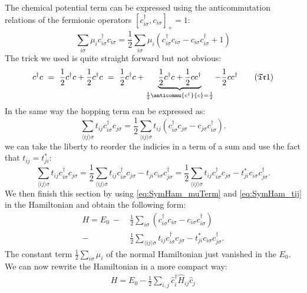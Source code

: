 \documentclass[../main.tex]{subfile}
\begin{document}
The chemical potential term can be expressed using the anticommutation relations of the fermionic operators $[c_{i\sigma}^{\dagger},c_{i\sigma}]_+ = 1$:
\begin{equation}\label{eq:SymHam_muTerm}
    \sum_{i\sigma} \mu_i c_{i\sigma}^{\dagger} c_{i\sigma} = \frac{1}{2}\sum_{i\sigma} \mu_i \left(c_{i\sigma}^{\dagger}c_{i\sigma} - c_{i\sigma}c_{i\sigma}^{\dagger} + 1\right)
\end{equation}
The trick we used is quite straight forward but not obvious: 
\[
    c^{\dagger}c ~=~ \frac{1}{2}c^{\dagger}c + \frac{1}{2}c^{\dagger}c ~=~ \frac{1}{2}c^{\dagger}c + \underbrace{\frac{1}{2}c^{\dagger}c + \frac{1}{2}cc^{\dagger}}_{\frac{1}{2}\anticommu{c^{\dagger}}{c} = \frac{1}{2}} - \frac{1}{2}cc^{\dagger} \tag{$\mathfrak{Tr}$1} \label{eq:Trick1}
\]
In the same way the hopping term can be expressed as:
\[
    \sum_{\langle ij\rangle\sigma} t_{ij} c_{i\sigma}^{\dagger} c_{j\sigma} = \frac{1}{2}\sum_{\langle ij\rangle \sigma} t_{ij} \left(c_{i\sigma}^{\dagger}c_{j\sigma} - c_{j\sigma}c_{i\sigma}^{\dagger}\right).
\]
we can take the liberty to reorder the indicies in a term of a sum and use the fact that $t_{ij} = t_{ji}^{\ast}$:
\begin{equation}\label{eq:SymHam_tij}
    \sum_{\langle ij\rangle\sigma} t_{ij} c_{i\sigma}^{\dagger} c_{j\sigma} = \frac{1}{2}\sum_{\langle ij\rangle \sigma} t_{ij}c_{i\sigma}^{\dagger}c_{j\sigma} - t_{ji}c_{i\sigma}c_{j\sigma}^{\dagger} = \frac{1}{2}\sum_{\langle ij\rangle \sigma} t_{ij}c_{i\sigma}^{\dagger}c_{j\sigma} - t_{ji}^{\ast}c_{i\sigma}c_{j\sigma}^{\dagger}.
\end{equation}
We then finish this section by using \ref{eq:SymHam_muTerm} and \ref{eq:SymHam_tij} in the Hamiltonian and obtain the following form:
\begin{align*}
    H = E_0 ~-~& \frac{1}{2} \sum_{i\sigma} \left(c_{i\sigma}^{\dagger}c_{i\sigma} - c_{i\sigma}c_{i\sigma}^{\dagger}\right)\\
    -& \frac{1}{2}\sum_{\langle ij\rangle \sigma} t_{ij}c_{i\sigma}^{\dagger}c_{j\sigma} - t_{ji}^{\ast}c_{i\sigma}c_{j\sigma}^{\dagger}.
\end{align*}
The constant term $\frac{1}{2} \sum_{i\sigma} \mu_i$ of the normal Hamiltonian just vanished in the $E_0$. 
We can now rewrite the Hamiltonian in a more compact way:
\begin{align}
    H = E_0 - \frac{1}{2}\sum_{i,j} \hat{c}_i^{\dagger} \hat{H}_{ij} \hat{c}_j  \label{eq:BdG_sys_H}
\end{align}
\end{document}

